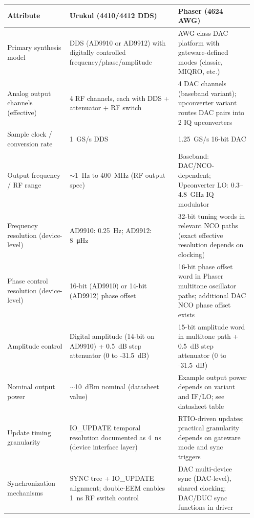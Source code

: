 \begin{table}[t]
\centering
\small
\begin{tabularx}{\linewidth}{lXX}
\toprule
Attribute & Urukul (4410/4412 DDS) & Phaser (4624 AWG) \\
\midrule
Primary synthesis model
& DDS (AD9910 or AD9912) with digitally controlled frequency/phase/amplitude
& AWG-class DAC platform with gateware-defined modes (classic, MIQRO, etc.) \\

Analog output channels (effective)
& 4 RF channels, each with DDS + attenuator + RF switch
& 4 DAC channels (baseband variant); upconverter variant routes DAC pairs into 2 IQ upconverters \\

Sample clock / conversion rate
& 1~GS/s DDS
& 1.25~GS/s 16-bit DAC \\

Output frequency / RF range
& $\sim$1~Hz to 400~MHz (RF output spec)
& Baseband: DAC/NCO-dependent; Upconverter LO: 0.3--4.8~GHz IQ modulator \\

Frequency resolution (device-level)
& AD9910: 0.25~Hz; AD9912: 8~\si{\micro\hertz}
& 32-bit tuning words in relevant NCO paths (exact effective resolution depends on clocking) \\

Phase control resolution (device-level)
& 16-bit (AD9910) or 14-bit (AD9912) phase offset
& 16-bit phase offset word in Phaser multitone oscillator paths; additional DAC NCO phase offset exists \\

Amplitude control
& Digital amplitude (14-bit on AD9910) + 0.5~dB step attenuator (0 to -31.5~dB)
& 15-bit amplitude word in multitone path + 0.5~dB step attenuator (0 to -31.5~dB) \\

Nominal output power
& $\sim$10~dBm nominal (datasheet value)
& Example output power depends on variant and IF/LO; see datasheet table \\

Update timing granularity
& IO\_UPDATE temporal resolution documented as 4~ns (device interface layer)
& RTIO-driven updates; practical granularity depends on gateware mode and sync triggers \\

Synchronization mechanisms
& SYNC tree + IO\_UPDATE alignment; double-EEM enables 1~ns RF switch control
& DAC multi-device sync (DAC-level), shared clocking; DAC/DUC sync functions in driver \\


\end{tabularx}
\end{table}
